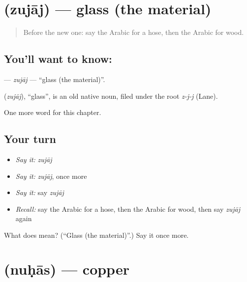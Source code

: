 \section[\texorpdfstring{\ar{زجاج} (zujāj)}{زجاج (zujāj)}]{ (zujāj) — glass (the material)}

\label{lesson:AR-C219-zujaj}



\begin{quote}
Before the new one: say the Arabic for a hose, then the Arabic for wood.
\end{quote}

\subsection*{You'll want to know: }
\textbf{} — \emph{zujāj} — \textquotedblleft{}glass (the material)\textquotedblright{}.

\begin{cousinweb}
\textbf{} (\emph{zujāj}), \textquotedblleft{}glass\textquotedblright{}, is an old native noun, filed under the root \emph{z-j-j} (Lane).
\end{cousinweb}

\begin{grammarlens}[title={What you've built}]
One more word for this chapter.
\end{grammarlens}

\subsection*{Your turn}
\begin{itemize}
\raggedright
  \item \emph{Say it:} \emph{zujāj}
  \item \emph{Say it:} \emph{zujāj}, once more
  \item \emph{Say it:} say \emph{zujāj}
  \item \emph{Recall:} say the Arabic for a hose, then the Arabic for wood, then say \emph{zujāj} again
\end{itemize}

\begin{tcolorbox}[breakable,colback=teal!4,colframe=teal!35!black,title={Before you move on}]
What does  mean? (\textquotedblleft{}Glass (the material)\textquotedblright{}.) Say it once more.
\end{tcolorbox}
\section[\texorpdfstring{\ar{نحاس} (nuḥās)}{نحاس (nuḥās)}]{ (nuḥās) — copper}

